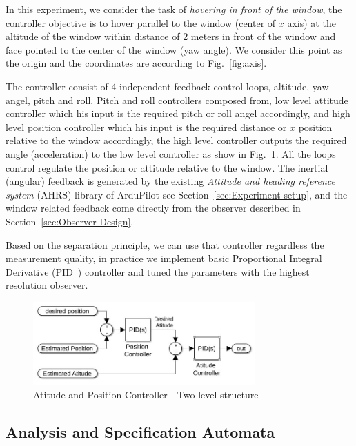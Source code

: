 \documentclass{sig-alternate-ipsn13}
\begin{document}
In this experiment, we consider the task of \textit{hovering in front of the window}, the controller objective is to hover parallel to the window (center of $x$ axis) at the altitude of the window within distance of 2 meters in front of the window and face pointed to the center of the window (yaw angle).
We consider this point as the origin and the coordinates are according to Fig.~\ref{fig:axis}.

The controller consist of 4 independent feedback control loops, altitude, yaw angel, pitch and roll.
Pitch and roll controllers composed from, low level attitude controller which his input is the required pitch or roll angel accordingly, and high level position controller which his input is the required distance or $x$ position relative to the window accordingly, the high level controller outputs the required angle (acceleration) to the low level controller as show in Fig.~\ref{fig:controllerStracture}.
All the loops control regulate the position or attitude relative to the window.
The inertial (angular) feedback is generated by the existing \textit{Attitude and heading reference system} (AHRS) library of ArduPilot see Section~\ref{sec:Experiment setup}, and the window related feedback come directly from the observer described in Section~\ref{sec:Observer Design}.

Based on the separation principle, we can use that controller regardless the measurement quality, in practice we implement basic Proportional Integral Derivative (PID~\cite{aastrom2006advanced}) controller and tuned the parameters with the highest resolution observer.

\begin{figure}[htbp]
    \centerline{\includegraphics[width=85mm]{two_level_controller.jpg}}
    \caption{Atitude and Position Controller - Two level structure}
    \label{fig:controllerStracture}
\end{figure}


\subsection{Analysis and Specification Automata}
\label{sec:Analysis}
\end{document}

